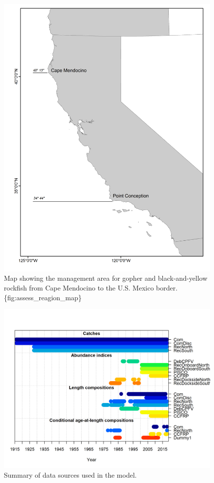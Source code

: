 \documentclass[12pt,]{article}
\begin{document}
\begin{figure}
\centering
\includegraphics{Figures/assess_region_map.png}
\caption{Map showing the management area for gopher and black-and-yellow
rockfish from Cape Mendocino to the U.S. Mexico
border.\{fig:assess\_reagion\_map\}}
\end{figure}

\begin{figure}
\centering
\includegraphics{r4ss/plots_mod1/data_plot.png}
\caption{Summary of data sources used in the model.
\label{fig:data_plot}}
\end{figure}
\end{document}
